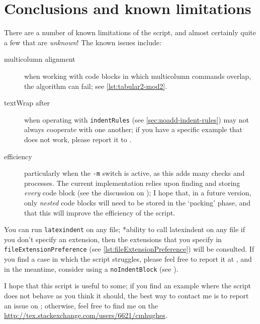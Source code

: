\section{Conclusions and known limitations}\label{sec:knownlimitations}
 There are a number of known limitations of the script, and almost certainly quite a few
 that are \emph{unknown}! The known issues include:
 \begin{description}
  \item[multicolumn alignment] when working with code blocks in which multicolumn
        commands overlap, the algorithm can fail; see \vref{lst:tabular2-mod2}.
  \item[textWrap after] when operating with \texttt{indentRules} (see
        \vref{sec:noadd-indent-rules}) may not always cooperate with one another; if you
        have a specific example that does not work, please report it to
        \cite{latexindent-home}.
  \item[efficiency] particularly when the \texttt{-m} switch is active, as this adds many
        checks and processes. The current implementation relies upon finding and storing
        \emph{every} code block (see the discussion on ); I hope
        that, in a future version, only \emph{nested} code blocks will need to be stored
        in the `packing' phase, and that this will improve the efficiency of the script.
 \end{description}

 You can run \texttt{latexindent} on any file; *{ability to call
 latexindent on any file} if you don't specify an extension, then the extensions that you
 specify in \lstinline[breaklines=true]!fileExtensionPreference! (see
 \vref{lst:fileExtensionPreference}) will be consulted. If you find a case in which the
 script struggles, please feel free to report it at \cite{latexindent-home}, and in the
 meantime, consider using a \texttt{noIndentBlock} (see ).%

 I hope that this script is useful to some; if you find an example where the script does
 not behave as you think it should, the best way to contact me is to report an issue on
 \cite{latexindent-home}; otherwise, feel free to find me on the
 \url{http://tex.stackexchange.com/users/6621/cmhughes}.
